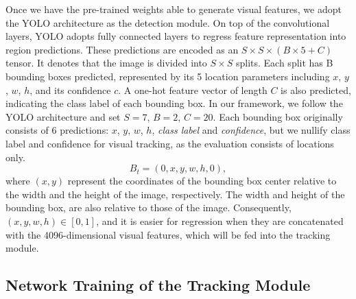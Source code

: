 \documentclass{article}
\begin{document}
Once we have the pre-trained weights able to generate visual features, we adopt the YOLO architecture as the detection module. %
On top of the convolutional layers, YOLO adopts fully connected layers to regress feature representation into region predictions.
These predictions are encoded as an $S \times S \times (B \times 5 + C)$ tensor. It denotes that the image is divided into $S \times S$ splits. Each split has B bounding boxes predicted, represented by its 5 location parameters including $x$, $y$, $w$, $h$, and its confidence $c$. A one-hot feature vector of length $C$ is also predicted, indicating the class label of each bounding box. In our framework, we follow the YOLO architecture and set $S = 7$, $B= 2$, $C= 20$.
Each bounding box originally consists of 6 predictions: $x$, $y$, $w$, $h$, \textit{class label} and \textit{confidence}, but we nullify class label and confidence for visual tracking, as the evaluation consists of locations only.
\begin{equation}
B_{t} = (0, x, y, w, h, 0),
\end{equation}
where $(x, y)$ represent the coordinates of the bounding box center relative to the width and the height of the image, respectively. The width and height of the bounding box, are also relative to those of the image. Consequently, $(x, y, w, h) \in [0, 1]$, and it is easier for regression when they are concatenated with the 4096-dimensional visual features, which will be fed into the tracking module.

\subsection{Network Training of the Tracking Module}
\end{document}
